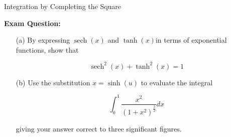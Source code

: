 \documentclass[10pt]{beamer}
\DeclareMathOperator{\sech}{sech}
\begin{document}
\begin{frame}{Integration by Completing the Square}

	\textbf{Exam Question:}
	
	\begin{itemize}
	
		\item [(a)] By expressing $\sech(x)$ and $\tanh(x)$in terms of exponential functions, show that 
		
			\begin{equation*}
				\sech^2(x) + \tanh^2(x) = 1
			\end{equation*}
		
		\item [(b)] Use the substitution $x = \sinh(u)$ to evaluate the integral
			
			\begin{equation*}
				\int_0^1 \frac{x^2}{\left(1+x^2\right)^{\frac32}}dx
			\end{equation*}		
			
		giving your answer correct to three significant figures.

		
	\end{itemize}

\end{frame}
\end{document}
